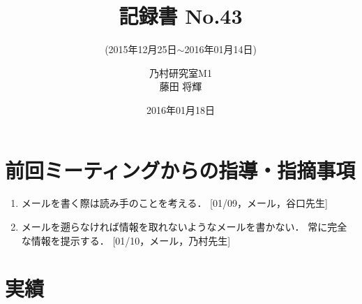 \documentclass[fleqn, 14pt]{extarticle}
\subtitle{(2015年12月25日$\sim$2016年01月14日)}
\author{乃村研究室M1\\藤田 将輝}
\date{2016年01月18日}
\title{記録書 No.43}
\begin{document}
    \maketitle

    \section{前回ミーティングからの指導・指摘事項}
    \label{sec-1}
    \begin{enumerate}

        \item メールを書く際は読み手のことを考える．
            \hfill
            [01/09，メール，谷口先生]

        \item メールを遡らなければ情報を取れないようなメールを書かない．
            常に完全な情報を提示する．
            \hfill
            [01/10，メール，乃村先生]

    \end{enumerate}

    \section{実績}
    \label{sec-2}
\end{document}
